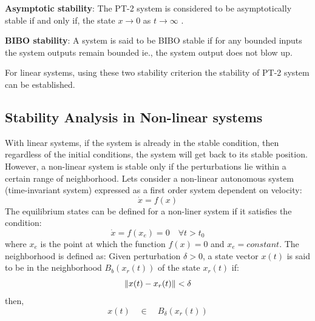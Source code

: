 \textbf{Asymptotic stability}: The PT-2 system is considered to be asymptotically stable if and only if, the state $x \rightarrow 0$ as $t \rightarrow \infty$ \cite[t.8.45]{RickHill_11}.

\textbf{BIBO stability}: A system is said to be BIBO stable if for any bounded inputs the system outputs remain bounded ie., the system output does not blow up.

For linear systems, using these two stability criterion the stability of PT-2 system can be established.

\subsection{Stability Analysis in Non-linear systems} \label{Sec:StabilityNonLinearSystems}

With linear systems, if the system is already in the stable condition, then regardless of the initial conditions, the system will get back to its stable position. However, a non-linear system is stable only if the perturbations lie within a certain range of neighborhood. Lets consider a non-linear autonomous system (time-invariant system) expressed as a first order system dependent on velocity:
\begin{equation}
\Dot{x} = f(x)
\end{equation}
The equilibrium states can be defined for a non-liner system if it satisfies the condition:
\begin{equation}
\Dot{x} = f(x_{e}) = 0 \quad \forall t > t_0
\end{equation}
where $x_e$ is the point at which the function $f(x) = 0$ and $x_e = constant$. The neighborhood is defined as: Given perturbation $\delta > 0$, a state vector $x(t)$ is said to be in the neighborhood $B_b(x_r(t))$ of the state $x_r(t)$ if:
\begin{equation}
\lVert x(t) - x_r(t)\rVert < \delta
\end{equation}
then,
\begin{equation}
x(t) \quad \in \quad B_{\delta}(x_r(t))
\end{equation}

